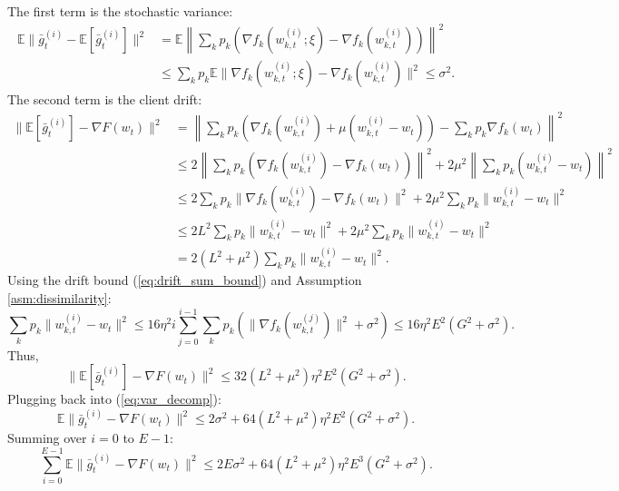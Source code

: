 \documentclass{article}
\begin{document}
The first term is the stochastic variance:
\begin{align}
    \mathbb{E} \| \bar{g}_t^{(i)} - \mathbb{E}[\bar{g}_t^{(i)}] \|^2 
    &= \mathbb{E} \left\| \sum_k p_k \left( \nabla f_k(w_{k,t}^{(i)}; \xi) - \nabla f_k(w_{k,t}^{(i)}) \right) \right\|^2 \\
    &\leq \sum_k p_k \mathbb{E} \| \nabla f_k(w_{k,t}^{(i)}; \xi) - \nabla f_k(w_{k,t}^{(i)}) \|^2 \leq \sigma^2.
\end{align}
The second term is the client drift:
\begin{align}
    \| \mathbb{E}[\bar{g}_t^{(i)}] - \nabla F(w_t) \|^2 
    &= \left\| \sum_k p_k \left( \nabla f_k(w_{k,t}^{(i)}) + \mu (w_{k,t}^{(i)} - w_t) \right) - \sum_k p_k \nabla f_k(w_t) \right\|^2 \\
    &\leq 2 \left\| \sum_k p_k \left( \nabla f_k(w_{k,t}^{(i)}) - \nabla f_k(w_t) \right) \right\|^2 + 2 \mu^2 \left\| \sum_k p_k (w_{k,t}^{(i)} - w_t) \right\|^2 \\
    &\leq 2 \sum_k p_k \| \nabla f_k(w_{k,t}^{(i)}) - \nabla f_k(w_t) \|^2 + 2 \mu^2 \sum_k p_k \| w_{k,t}^{(i)} - w_t \|^2 \\
    &\leq 2 L^2 \sum_k p_k \| w_{k,t}^{(i)} - w_t \|^2 + 2 \mu^2 \sum_k p_k \| w_{k,t}^{(i)} - w_t \|^2 \\
    &= 2 (L^2 + \mu^2) \sum_k p_k \| w_{k,t}^{(i)} - w_t \|^2.
\end{align}
Using the drift bound (\ref{eq:drift_sum_bound}) and Assumption \ref{asm:dissimilarity}:
\begin{equation}
    \sum_k p_k \| w_{k,t}^{(i)} - w_t \|^2 \leq 16 \eta^2 i \sum_{j=0}^{i-1} \sum_k p_k \left( \| \nabla f_k(w_{k,t}^{(j)}) \|^2 + \sigma^2 \right) \leq 16 \eta^2 E^2 (G^2 + \sigma^2).
\end{equation}
Thus,
\begin{equation}
    \| \mathbb{E}[\bar{g}_t^{(i)}] - \nabla F(w_t) \|^2 \leq 32 (L^2 + \mu^2) \eta^2 E^2 (G^2 + \sigma^2).
\end{equation}
Plugging back into (\ref{eq:var_decomp}):
\begin{equation}
    \mathbb{E} \| \bar{g}_t^{(i)} - \nabla F(w_t) \|^2 \leq 2\sigma^2 + 64 (L^2 + \mu^2) \eta^2 E^2 (G^2 + \sigma^2).
\end{equation}
Summing over $i=0$ to $E-1$:
\begin{equation}
    \sum_{i=0}^{E-1} \mathbb{E} \| \bar{g}_t^{(i)} - \nabla F(w_t) \|^2 \leq 2E\sigma^2 + 64 (L^2 + \mu^2) \eta^2 E^3 (G^2 + \sigma^2). \label{eq:var_sum}
\end{equation}
\end{document}
